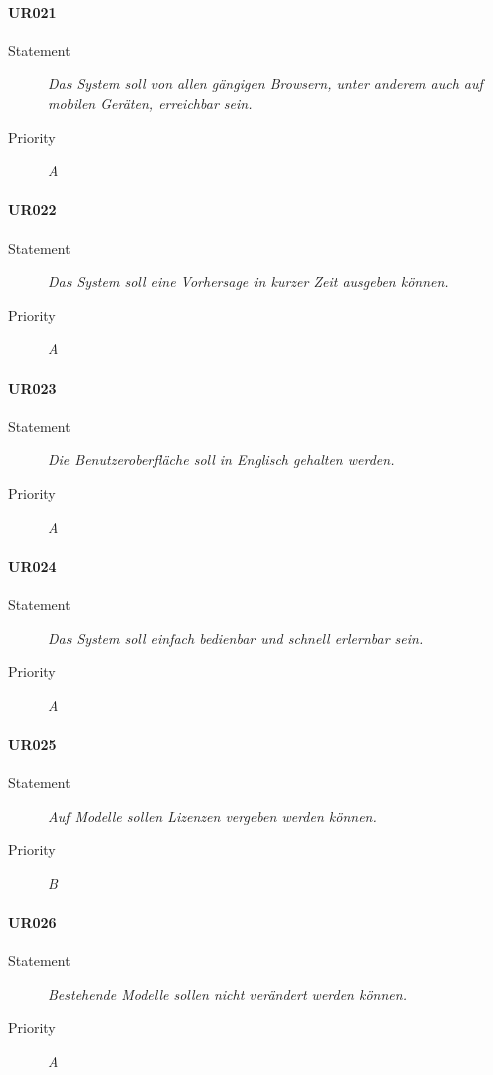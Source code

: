 \paragraph{UR021}
\begin{description}
\item[Statement] \textit{Das System soll von allen gängigen Browsern, unter anderem auch auf mobilen Geräten, erreichbar sein.}
\item[Priority] \textit{A}
\end{description}

\paragraph{UR022}
\begin{description}
\item[Statement] \textit{Das System soll eine Vorhersage in kurzer Zeit ausgeben können.}
\item[Priority] \textit{A}
\end{description}

\paragraph{UR023}
\begin{description}
\item[Statement] \textit{Die Benutzeroberfläche soll in Englisch gehalten werden.}
\item[Priority] \textit{A}
\end{description}

\paragraph{UR024}
\begin{description}
\item[Statement] \textit{Das System soll einfach bedienbar und schnell erlernbar sein.}
  \item[Priority]
    \textit{A}
\end{description}

\paragraph{UR025}
\begin{description}
\item[Statement] \textit{Auf Modelle sollen Lizenzen vergeben werden können.}
\item[Priority] \textit{B}
\end{description}

\paragraph{UR026}
\begin{description}
\item[Statement] \textit{Bestehende Modelle sollen nicht verändert werden können.}
\item[Priority] \textit{A}
\end{description}
